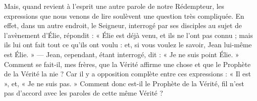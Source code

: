 Mais, quand revient à l’esprit une autre parole de notre Rédempteur, les expressions que nous venons de lire soulèvent une question très compliquée. En effet, dans un autre endroit, le Seigneur, interrogé par ses disciples au sujet de l’avènement d’Élie, répondit : « Élie est déjà venu, et ils ne l’ont pas connu ; mais ils lui ont fait tout ce qu’ils ont voulu : et, si vous voulez le savoir, Jean lui-même est Élie. » — Jean, cependant, étant interrogé, dit : « Je ne suis point Élie. » Comment se fait-il, mes frères, que la Vérité affirme une chose et que le Prophète de la Vérité la nie ? Car il y a opposition complète entre ces expressions : « Il est », et, « Je ne suis pas. » Comment donc est-il le Prophète de la Vérité, fil n’est pas d’accord avec les paroles de cette même Vérité ?